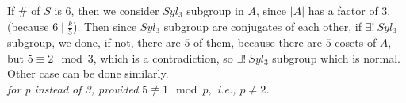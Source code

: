 \documentclass{article}
\begin{document}
\begin{homeworkProblem}
    If \# of $S$ is $6$, then we consider $Syl_3$ subgroup in $A$,
    since $\lvert A \rvert$ has a factor of $3$. 
    (because $6 \mid \frac{ k }{ 5 }$). 
    Then since $Syl_3$ subgroup are conjugates of each other, 
    if $\exists ! \ Syl_3$ subgroup, we done, if not, there are 
    $5$ of them, because there are $5$ cosets of $A$,
    but $5 \equiv 2 \mod 3$, 
    which is a contradiction, so $\exists ! \ Syl_3$ 
    subgroup which is normal. 
    Other case can be done similarly.\\
    \textit{for p instead of 3, provided $5 \not\equiv 1 \mod p,$
    i.e., $p \neq 2$.}\\
    



    
\end{homeworkProblem}
\end{document}
